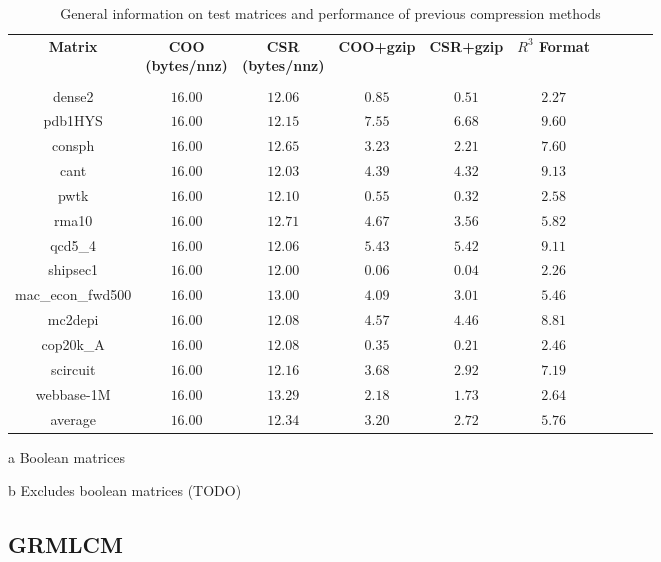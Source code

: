 \begin{table*}
\centering
\begin{threeparttable}
\caption{General information on test matrices and performance of previous compression methods}
\label{tbl:analysis}
\begin{tabular}{cccccccccc}
\hline
\bfseries Matrix & \bfseries \shortstack{COO\\(bytes/nnz)} & \bfseries \shortstack{CSR\\(bytes/nnz)} & \bfseries COO+gzip &\bfseries CSR+gzip & \bfseries $R^3$ Format \\
 \\
\hline
dense2\tnote{a} &  $16.00$ & $12.06$ & $0.85$ & $0.51$ & $2.27$ \\
pdb1HYS & $16.00$ & $12.15$ & $7.55$ & $6.68$ & $9.60$ \\
consph & $16.00$ & $12.65$ & $3.23$ & $2.21$ & $7.60$ \\
cant &  $16.00$ & $12.03$ & $4.39$ & $4.32$ & $9.13$ \\
pwtk &  $16.00$ & $12.10$ & $0.55$ & $0.32$ & $2.58$ \\
rma10\tnote{a} &  $16.00$ & $12.71$ & $4.67$ & $3.56$ & $5.82$ \\
qcd5\_4\tnote{a} &$16.00$ & $12.06$ & $5.43$ & $5.42$ & $9.11$ \\
shipsec1 &  $16.00$ & $12.00$ & $0.06$ & $0.04$ & $2.26$ \\
mac\_econ\_fwd500 &  $16.00$ & $13.00$ & $4.09$ & $3.01$ & $5.46$ \\
mc2depi &  $16.00$ & $12.08$ & $4.57$ & $4.46$ & $8.81$ \\
cop20k\_A &  $16.00$ & $12.08$ & $0.35$ & $0.21$ & $2.46$ \\
scircuit & $16.00$ & $12.16$ & $3.68$ & $2.92$ & $7.19$ \\
webbase-1M & $16.00$ & $13.29$ & $2.18$ & $1.73$ & $2.64$ \\
\hline
average\tnote{b} &  $16.00$ & $12.34$ & $3.20$ & $2.72$ & $5.76$ \\

\hline
\end{tabular}
\begin{tablenotes}
\item [a] Boolean matrices
\item [b] Excludes boolean matrices (TODO)
\end{tablenotes}
\end{threeparttable}
\end{table*}
\subsection{GRMLCM}
\label{sec:grmlcm}
